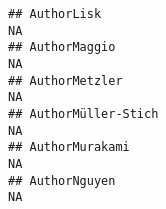 \documentclass[]{article}
\begin{document}
\begin{verbatim}
## AuthorLisk                                                                                                                                                                                                                                                                                                                                                                                                                                                                              NA
## AuthorMaggio                                                                                                                                                                                                                                                                                                                                                                                                                                                                            NA
## AuthorMetzler                                                                                                                                                                                                                                                                                                                                                                                                                                                                           NA
## AuthorMüller-Stich                                                                                                                                                                                                                                                                                                                                                                                                                                                                      NA
## AuthorMurakami                                                                                                                                                                                                                                                                                                                                                                                                                                                                          NA
## AuthorNguyen                                                                                                                                                                                                                                                                                                                                                                                                                                                                            NA

\end{verbatim}
\end{document}
